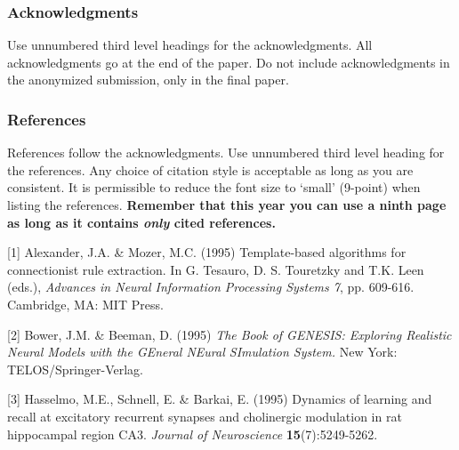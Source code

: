 \documentclass{article} %
\begin{document}
\subsubsection*{Acknowledgments}

Use unnumbered third level headings for the acknowledgments. All
acknowledgments go at the end of the paper. Do not include 
acknowledgments in the anonymized submission, only in the 
final paper. 

\subsubsection*{References}

References follow the acknowledgments. Use unnumbered third level heading for
the references. Any choice of citation style is acceptable as long as you are
consistent. It is permissible to reduce the font size to `small' (9-point) 
when listing the references. {\bf Remember that this year you can use
a ninth page as long as it contains \emph{only} cited references.}

\small{
[1] Alexander, J.A. \& Mozer, M.C. (1995) Template-based algorithms
for connectionist rule extraction. In G. Tesauro, D. S. Touretzky
and T.K. Leen (eds.), {\it Advances in Neural Information Processing
Systems 7}, pp. 609-616. Cambridge, MA: MIT Press.

[2] Bower, J.M. \& Beeman, D. (1995) {\it The Book of GENESIS: Exploring
Realistic Neural Models with the GEneral NEural SImulation System.}
New York: TELOS/Springer-Verlag.

[3] Hasselmo, M.E., Schnell, E. \& Barkai, E. (1995) Dynamics of learning
and recall at excitatory recurrent synapses and cholinergic modulation
in rat hippocampal region CA3. {\it Journal of Neuroscience}
{\bf 15}(7):5249-5262.
}
\end{document}
